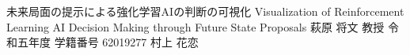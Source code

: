 \documentclass[final,a4j,12pt]{jreport}
\begin{document}
\begin{titlepage}
\thesis
{未来局面の提示による強化学習AIの判断の可視化}
{Visualization of Reinforcement Learning AI Decision Making through Future State Proposals}
{萩原 将文 教授}
{令和五年度}
{学籍番号 62019277}
{村上 花恋}
\end{titlepage}

\contents










\newpage
\pagestyle{fancyplain}\lfoot{}\cfoot{\thepage}\rhead{}
\chead{} \rhead{}
\printbibliography[title=参考文献]

\appendix





\end{document}

